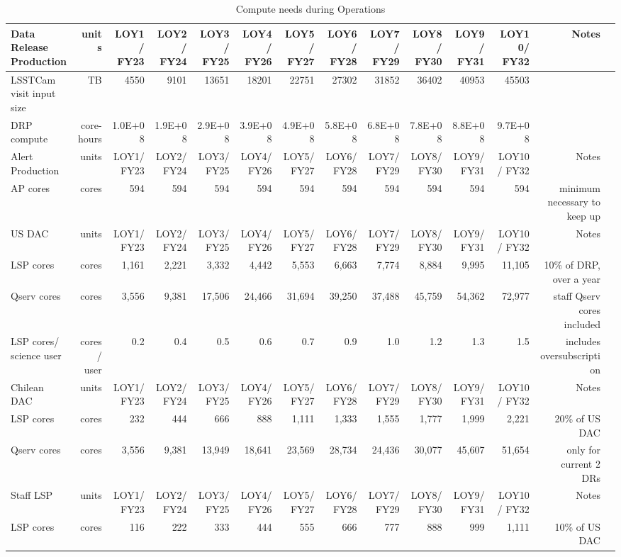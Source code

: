\tiny \begin{longtable} { |p{}  |r  |r  |r  |r  |r  |r  |r  |r  |r  |r  |r  |r  |r |} 
\caption{Compute needs during Operations \label{tab:computeSizingOps}}\\ 
\hline 
\textbf{Data Release Production}&\textbf{units}&\textbf{LOY1/ FY23}&\textbf{LOY2/ FY24}&\textbf{LOY3/ FY25}&\textbf{LOY4/ FY26}&\textbf{LOY5/ FY27}&\textbf{LOY6/ FY28}&\textbf{LOY7/ FY29}&\textbf{LOY8/ FY30}&\textbf{LOY9/ FY31}&\textbf{LOY10/ FY32}&\textbf{Notes} \\ \hline
{LSSTCam visit input size}&{TB}&{4550}&{9101}&{13651}&{18201}&{22751}&{27302}&{31852}&{36402}&{40953}&{45503}& \\ \hline
{DRP compute}&{core-hours}&{1.0E+08}&{1.9E+08}&{2.9E+08}&{3.9E+08}&{4.9E+08}&{5.8E+08}&{6.8E+08}&{7.8E+08}&{8.8E+08}&{9.7E+08}& \\ \hline
{Alert Production}&{units}&{LOY1/ FY23}&{LOY2/ FY24}&{LOY3/ FY25}&{LOY4/ FY26}&{LOY5/ FY27}&{LOY6/ FY28}&{LOY7/ FY29}&{LOY8/ FY30}&{LOY9/ FY31}&{LOY10/ FY32}&{Notes} \\ \hline
{AP cores}&{cores}&{594}&{594}&{594}&{594}&{594}&{594}&{594}&{594}&{594}&{594}&{minimum necessary to keep up} \\ \hline
{US DAC}&{units}&{LOY1/ FY23}&{LOY2/ FY24}&{LOY3/ FY25}&{LOY4/ FY26}&{LOY5/ FY27}&{LOY6/ FY28}&{LOY7/ FY29}&{LOY8/ FY30}&{LOY9/ FY31}&{LOY10/ FY32}&{Notes} \\ \hline
{LSP cores}&{cores}&{1,161}&{2,221}&{3,332}&{4,442}&{5,553}&{6,663}&{7,774}&{8,884}&{9,995}&{11,105}&{10\% of DRP, over a year} \\ \hline
{Qserv cores}&{cores}&{3,556}&{9,381}&{17,506}&{24,466}&{31,694}&{39,250}&{37,488}&{45,759}&{54,362}&{72,977}&{staff Qserv cores included} \\ \hline
{LSP cores/ science user}&{cores/ user}&{0.2}&{0.4}&{0.5}&{0.6}&{0.7}&{0.9}&{1.0}&{1.2}&{1.3}&{1.5}&{includes oversubscription} \\ \hline
{Chilean DAC}&{units}&{LOY1/ FY23}&{LOY2/ FY24}&{LOY3/ FY25}&{LOY4/ FY26}&{LOY5/ FY27}&{LOY6/ FY28}&{LOY7/ FY29}&{LOY8/ FY30}&{LOY9/ FY31}&{LOY10/ FY32}&{Notes} \\ \hline
{LSP cores}&{cores}&{232}&{444}&{666}&{888}&{1,111}&{1,333}&{1,555}&{1,777}&{1,999}&{2,221}&{20\% of US DAC} \\ \hline
{Qserv cores}&{cores}&{3,556}&{9,381}&{13,949}&{18,641}&{23,569}&{28,734}&{24,436}&{30,077}&{45,607}&{51,654}&{only for current 2 DRs} \\ \hline
{Staff LSP}&{units}&{LOY1/ FY23}&{LOY2/ FY24}&{LOY3/ FY25}&{LOY4/ FY26}&{LOY5/ FY27}&{LOY6/ FY28}&{LOY7/ FY29}&{LOY8/ FY30}&{LOY9/ FY31}&{LOY10/ FY32}&{Notes} \\ \hline
{LSP cores}&{cores}&{116}&{222}&{333}&{444}&{555}&{666}&{777}&{888}&{999}&{1,111}&{10\% of US DAC} \\ \hline
\end{longtable} \normalsize
